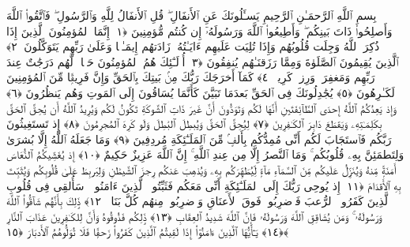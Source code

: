 
  
    
  
    
    

\nopagebreak
  بِسمِ ٱللَّهِ ٱلرَّحمَـٰنِ ٱلرَّحِيمِ
  يَسـَٔلُونَكَ عَنِ ٱلأَنفَالِ ۖ قُلِ ٱلأَنفَالُ لِلَّهِ وَٱلرَّسُولِ ۖ فَٱتَّقُوا۟ ٱللَّهَ وَأَصلِحُوا۟ ذَاتَ بَينِكُم ۖ وَأَطِيعُوا۟ ٱللَّهَ وَرَسُولَهُۥٓ إِن كُنتُم مُّؤمِنِينَ ﴿١﴾
 إِنَّمَا ٱلمُؤمِنُونَ ٱلَّذِينَ إِذَا ذُكِرَ ٱللَّهُ وَجِلَت قُلُوبُهُم وَإِذَا تُلِيَت عَلَيهِم ءَايَـٰتُهُۥ زَادَتهُم إِيمَـٰنًۭا وَعَلَىٰ رَبِّهِم يَتَوَكَّلُونَ ﴿٢﴾
 ٱلَّذِينَ يُقِيمُونَ ٱلصَّلَوٰةَ وَمِمَّا رَزَقنَـٰهُم يُنفِقُونَ ﴿٣﴾
 أُو۟لَـٰٓئِكَ هُمُ ٱلمُؤمِنُونَ حَقًّۭا ۚ لَّهُم دَرَجَٰتٌ عِندَ رَبِّهِم وَمَغفِرَةٌۭ وَرِزقٌۭ كَرِيمٌۭ ﴿٤﴾
 كَمَآ أَخرَجَكَ رَبُّكَ مِنۢ بَيتِكَ بِٱلحَقِّ وَإِنَّ فَرِيقًۭا مِّنَ ٱلمُؤمِنِينَ لَكَـٰرِهُونَ ﴿٥﴾
 يُجَٰدِلُونَكَ فِى ٱلحَقِّ بَعدَمَا تَبَيَّنَ كَأَنَّمَا يُسَاقُونَ إِلَى ٱلمَوتِ وَهُم يَنظُرُونَ ﴿٦﴾
 وَإِذ يَعِدُكُمُ ٱللَّهُ إِحدَى ٱلطَّآئِفَتَينِ أَنَّهَا لَكُم وَتَوَدُّونَ أَنَّ غَيرَ ذَاتِ ٱلشَّوكَةِ تَكُونُ لَكُم وَيُرِيدُ ٱللَّهُ أَن يُحِقَّ ٱلحَقَّ بِكَلِمَـٰتِهِۦ وَيَقطَعَ دَابِرَ ٱلكَـٰفِرِينَ ﴿٧﴾
 لِيُحِقَّ ٱلحَقَّ وَيُبطِلَ ٱلبَٰطِلَ وَلَو كَرِهَ ٱلمُجرِمُونَ ﴿٨﴾
 إِذ تَستَغِيثُونَ رَبَّكُم فَٱستَجَابَ لَكُم أَنِّى مُمِدُّكُم بِأَلفٍۢ مِّنَ ٱلمَلَـٰٓئِكَةِ مُردِفِينَ ﴿٩﴾
 وَمَا جَعَلَهُ ٱللَّهُ إِلَّا بُشرَىٰ وَلِتَطمَئِنَّ بِهِۦ قُلُوبُكُم ۚ وَمَا ٱلنَّصرُ إِلَّا مِن عِندِ ٱللَّهِ ۚ إِنَّ ٱللَّهَ عَزِيزٌ حَكِيمٌ ﴿١٠﴾
 إِذ يُغَشِّيكُمُ ٱلنُّعَاسَ أَمَنَةًۭ مِّنهُ وَيُنَزِّلُ عَلَيكُم مِّنَ ٱلسَّمَآءِ مَآءًۭ لِّيُطَهِّرَكُم بِهِۦ وَيُذهِبَ عَنكُم رِجزَ ٱلشَّيطَٰنِ وَلِيَربِطَ عَلَىٰ قُلُوبِكُم وَيُثَبِّتَ بِهِ ٱلأَقدَامَ ﴿١١﴾
 إِذ يُوحِى رَبُّكَ إِلَى ٱلمَلَـٰٓئِكَةِ أَنِّى مَعَكُم فَثَبِّتُوا۟ ٱلَّذِينَ ءَامَنُوا۟ ۚ سَأُلقِى فِى قُلُوبِ ٱلَّذِينَ كَفَرُوا۟ ٱلرُّعبَ فَٱضرِبُوا۟ فَوقَ ٱلأَعنَاقِ وَٱضرِبُوا۟ مِنهُم كُلَّ بَنَانٍۢ ﴿١٢﴾
 ذَٟلِكَ بِأَنَّهُم شَآقُّوا۟ ٱللَّهَ وَرَسُولَهُۥ ۚ وَمَن يُشَاقِقِ ٱللَّهَ وَرَسُولَهُۥ فَإِنَّ ٱللَّهَ شَدِيدُ ٱلعِقَابِ ﴿١٣﴾
 ذَٟلِكُم فَذُوقُوهُ وَأَنَّ لِلكَـٰفِرِينَ عَذَابَ ٱلنَّارِ ﴿١٤﴾
 يَـٰٓأَيُّهَا ٱلَّذِينَ ءَامَنُوٓا۟ إِذَا لَقِيتُمُ ٱلَّذِينَ كَفَرُوا۟ زَحفًۭا فَلَا تُوَلُّوهُمُ ٱلأَدبَارَ ﴿١٥﴾
